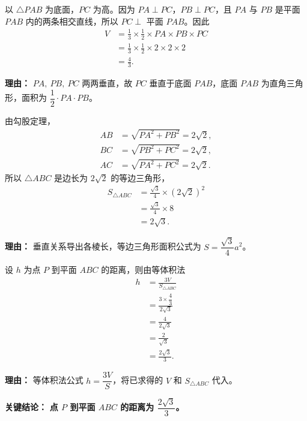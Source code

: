\begin{description}[style=nextline, leftmargin=2.8em, labelsep=0.5em, itemsep=0.45em]
	\item[\textbf{第一步（求三棱锥体积）：}]
	      以 $\triangle PAB$ 为底面，$PC$ 为高。因为 $PA\perp PC$，$PB\perp PC$，且 $PA$ 与 $PB$ 是平面 $PAB$ 内的两条相交直线，所以 $PC\perp$ 平面 $PAB$。因此
	      \[
		      \begin{aligned}
			      V & = \frac13 \times \frac12 \times PA \times PB \times PC \\
			        & = \frac13 \times \frac12 \times 2 \times 2 \times 2    \\
			        & = \frac{4}{3}.
		      \end{aligned}
	      \]

	      \par\textbf{理由：}
	      $PA,\ PB,\ PC$ 两两垂直，故 $PC$ 垂直于底面 $PAB$，底面 $PAB$ 为直角三角形，面积为 $\dfrac12 \cdot PA \cdot PB$。

	\item[\textbf{第二步（求底面 $\triangle ABC$ 的面积）：}]
	      由勾股定理，
	      \[
		      \begin{aligned}
			      AB & = \sqrt{PA^2+PB^2}=2\sqrt{2}, \\
			      BC & = \sqrt{PB^2+PC^2}=2\sqrt{2}, \\
			      AC & = \sqrt{PA^2+PC^2}=2\sqrt{2}.
		      \end{aligned}
	      \]
	      所以 $\triangle ABC$ 是边长为 $2\sqrt{2}$ 的等边三角形，
	      \[
		      \begin{aligned}
			      S_{\triangle ABC}
			       & = \frac{\sqrt3}{4} \times (2\sqrt{2})^2 \\
			       & = \frac{\sqrt3}{4} \times 8             \\
			       & = 2\sqrt{3}.
		      \end{aligned}
	      \]

	      \par\textbf{理由：}
	      垂直关系导出各棱长，等边三角形面积公式为 $S=\dfrac{\sqrt3}{4}a^2$。

	\item[\textbf{第三步（等体积法求距离）：}]
	      设 $h$ 为点 $P$ 到平面 $ABC$ 的距离，则由等体积法
	      \[
		      \begin{aligned}
			      h & = \frac{3V}{S_{\triangle ABC}}            \\
			        & = \frac{3 \times \dfrac{4}{3}}{2\sqrt{3}} \\
			        & = \frac{4}{2\sqrt{3}}                     \\
			        & = \frac{2}{\sqrt{3}}                      \\
			        & = \frac{2\sqrt{3}}{3}.
		      \end{aligned}
	      \]

	      \par\textbf{理由：}
	      等体积法公式 $h=\dfrac{3V}{S}$，将已求得的 $V$ 和 $S_{\triangle ABC}$ 代入。
\end{description}

\textbf{\textcolor{CExample}{关键结论：}} \textbf{点 $P$ 到平面 $ABC$ 的距离为 $\dfrac{2\sqrt{3}}{3}$。}